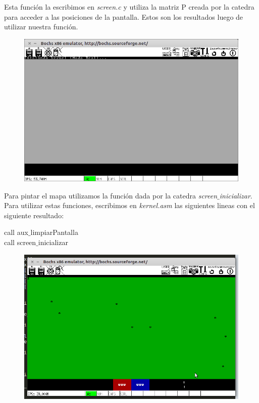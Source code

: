 Esta función la escribimos en \textit{screen.c} y utiliza la matriz P creada por la catedra para acceder a las posiciones de la pantalla. Estos son los resultados luego de utilizar nuestra función. \\

\begin{figure}[H]
\begin{center}
  \includegraphics[width=\linewidth]{ejercicio1/pantgris.png}
  \caption{{\small}} 
\endminipage
\end{center}
\end{figure}


Para pintar el mapa utilizamos la función dada por la catedra  \textit{screen$\_$inicializar}. Para utilizar estas funciones, escribimos en \textit{kernel.asm} las siguientes lineas con el siguiente resultado:

\begin{center}
 call aux$\_$limpiarPantalla    \\
 call screen$\_$inicializar$~~~$
\end{center}

\begin{figure}[H]
\begin{center}
  \includegraphics[width=\linewidth]{ejercicio1/mapa.png}
  \caption{{\small}} 
\endminipage
\end{center}
\end{figure}

